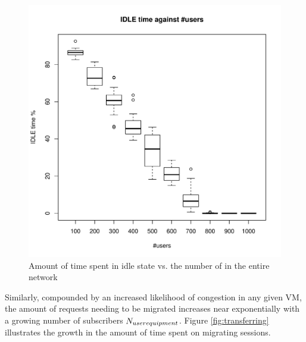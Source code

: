 \begin{figure}[tb]
	\centering
	\includegraphics[width=\linewidth]{IDLE.pdf} 
	\caption{Amount of time spent in idle state vs. the number of \ues in the entire network}
	\label{fig:idle}
\end{figure}

Similarly, compounded by an increased likelihood of congestion in any given VM, the amount of requests needing to be migrated increases near exponentially with a growing number of subscribers $N_{user equipment}$. Figure \ref{fig:transferring} illustrates the growth in the amount of time spent on migrating sessions.

